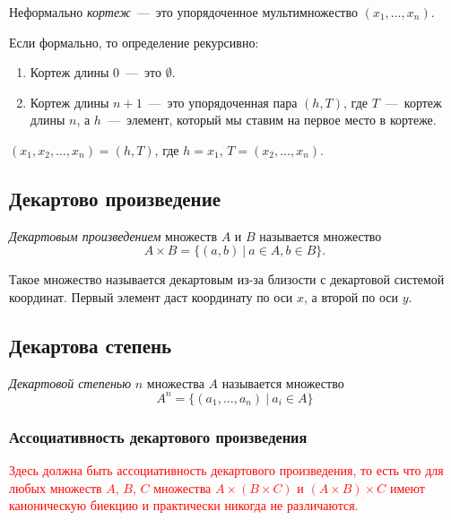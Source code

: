 \begin{definition}
	Неформально \textit{кортеж}~---~это упорядоченное мультимножество $(x_1, \ldots, x_n)$.
	
	Если формально, то определение рекурсивно:
	\begin{enumerate}
		\item Кортеж длины 0~---~это $\emptyset$.
		\item Кортеж длины $n + 1$~---~это упорядоченная пара $(h, T)$, где $T$~---~кортеж длины $n$, а $h$~---~элемент, который мы ставим на первое место в кортеже.
	\end{enumerate}
\end{definition}

\begin{example}
	$(x_1, x_2, \dots, x_n) = (h, T)$, где $h = x_1$, $T = (x_2, \dots, x_n)$.
\end{example}

\subsection{Декартово произведение}

\begin{definition}
	\textit{Декартовым произведением} множеств $A$ и $B$ называется множество
	$$
	A \times B = \{(a, b)\ |\ a \in A, b \in B\}.
	$$
\end{definition}

\begin{note}
	Такое множество называется декартовым из-за близости с декартовой системой координат. Первый элемент даст координату по оси $x$, а второй по оси $y$.
\end{note}

\subsection{Декартова степень}

\begin{definition}
	\textit{Декартовой степенью} $n$ множества $A$ называется множество
	$$
	A^n = \{(a_1, \dots, a_n)\ |\ a_i \in A\}
	$$
\end{definition}

\subsubsection*{Ассоциативность декартового произведения}

\textcolor{red}{Здесь должна быть ассоциативность декартового произведения, 
то есть что для любых множеств $A$, $B$, $C$ множества $A \times (B \times C)$
и $(A \times B) \times C$ имеют каноническую биекцию и практически никогда 
не различаются.}

